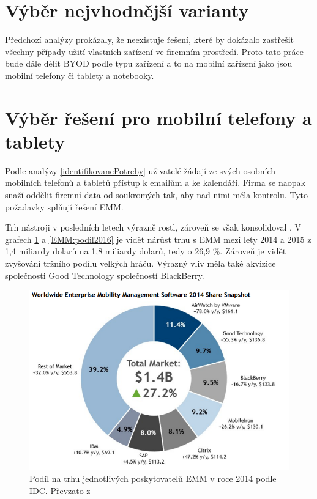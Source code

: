 \section{Výběr nejvhodnější varianty}

Předchozí analýzy prokázaly, že neexistuje řešení, které by dokázalo zastřešit všechny případy užití vlastních zařízení ve firemním prostředí. Proto tato práce bude dále dělit BYOD podle typu zařízení a to na mobilní zařízení jako jsou mobilní telefony či tablety a notebooky.

\section{Výběr řešení pro mobilní telefony a tablety}

Podle analýzy \ref{identifikovanePotreby} uživatelé žádají ze svých osobních mobilních telefonů a tabletů přístup k emailům a ke kalendáři. Firma se naopak snaží oddělit firemní data od soukromých tak, aby nad nimi měla kontrolu. Tyto požadavky splňují řešení EMM.  

Trh nástroji v posledních letech výrazně rostl, zároveň se však konsolidoval \cite{IDC2}. %
V grafech \ref{EMM:podil2015} a \ref{EMM:podil2016} je vidět nárůst trhu s EMM mezi lety 2014 a 2015 z 1,4 miliardy dolarů na 1,8 miliardy dolarů, tedy o 26,9 \%. Zároveň je vidět zvyšování tržního podílu velkých hráču. Výrazný vliv měla také akvizice společnosti Good Technology společností BlackBerry.

 
\begin{figure}[h!]
\includegraphics[width=13cm]{img/IDC_EMM}
\caption{Podíl na trhu jednotlivých poskytovatelů EMM v roce 2014 podle IDC. Převzato z \cite{IDC1}} 
\label{EMM:podil2015}
\centering
\end{figure}%

